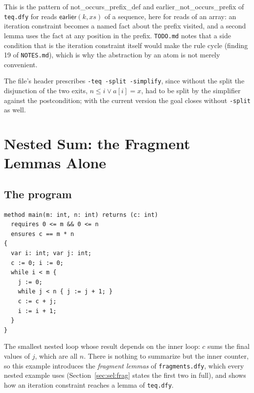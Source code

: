 \documentclass[11pt,a4paper]{article}
\newcommand{\lemma}[1]{\textsf{#1}}
\begin{document}
This is the pattern of \lemma{not\_occurs\_prefix\_def} and \lemma{earlier\_not\_occurs\_prefix} of
\texttt{teq.dfy} for reads $\mathsf{earlier}(k, xs)$ of a sequence, here for reads of an array: an
iteration constraint becomes a named fact about the prefix visited, and a second lemma uses the fact at
any position in the prefix. \texttt{TODO.md} notes that a side condition that is the iteration constraint
itself would make the rule cycle (finding 19 of \texttt{NOTES.md}), which is why the abstraction by an
atom is not merely convenient.

The file's header prescribes \texttt{-teq -split -simplify}, since without the split the disjunction of
the two exits, $n \le i \vee a[i] = x$, had to be split by the simplifier against the postcondition; with
the current version the goal closes without \texttt{-split} as well.

\section{Nested Sum: the Fragment Lemmas Alone}\label{sec:nsum}

\subsection{The program}
\begin{lstlisting}
method main(m: int, n: int) returns (c: int)
  requires 0 <= m && 0 <= n
  ensures c == m * n
{
  var i: int; var j: int;
  c := 0; i := 0;
  while i < m {
    j := 0;
    while j < n { j := j + 1; }
    c := c + j;
    i := i + 1;
  }
}
\end{lstlisting}
The smallest nested loop whose result depends on the inner loop: $c$ sums the final values of $j$,
which are all $n$. There is nothing to summarize but the inner counter, so this example introduces the
\emph{fragment lemmas} of \texttt{fragments.dfy}, which every nested example uses (Section~\ref{sec:sel:frag}
states the first two in full), and shows how an iteration constraint reaches a lemma of \texttt{teq.dfy}.
\end{document}
